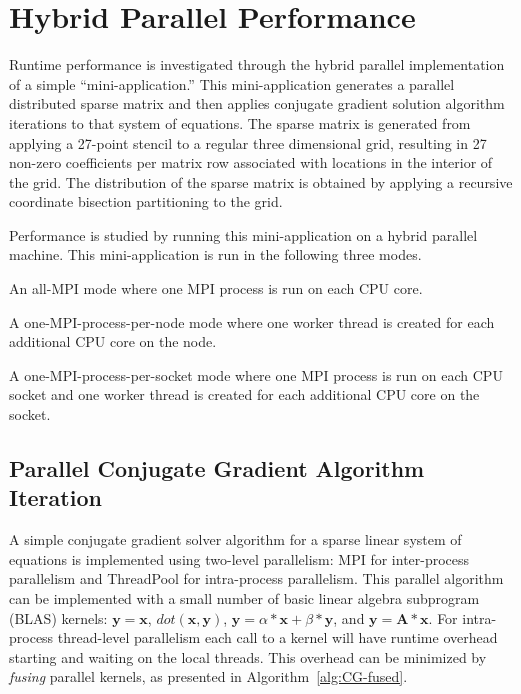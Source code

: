 \section{Hybrid Parallel Performance}

Runtime performance is investigated through the hybrid parallel implementation of a simple ``mini-application.'' 
%
This mini-application generates a parallel distributed sparse matrix and then applies conjugate gradient solution algorithm iterations to that system of equations.
%
The sparse matrix is generated from applying a 27-point stencil to a regular three dimensional grid, resulting in 27 non-zero coefficients per matrix row associated with locations in the interior of the grid.
%
The distribution of the sparse matrix is obtained by applying a recursive coordinate bisection \cite{RCB:1989} partitioning to the grid.


Performance is studied by running this mini-application on a hybrid parallel machine.
%
This mini-application is run in the following three modes.
\begin{blist}
\item An all-MPI mode where one MPI process is run on each CPU core.
\item A one-MPI-process-per-node mode where one worker thread is created for each additional CPU core on the node.
\item A one-MPI-process-per-socket mode where one MPI process is run on each CPU socket and one worker thread is created for each additional CPU core on the socket.
\end{blist}


\clearpage
\subsection{Parallel Conjugate Gradient Algorithm Iteration}

A simple conjugate gradient solver algorithm for a sparse linear system of equations is implemented using two-level parallelism: MPI for inter-process parallelism and ThreadPool for intra-process parallelism.
%
This parallel algorithm can be implemented with a small number of basic linear algebra subprogram (BLAS) kernels: 
$\mathbf{y}=\mathbf{x}$,
$dot(\mathbf{x},\mathbf{y})$, 
$\mathbf{y}=\alpha*\mathbf{x}+\beta*\mathbf{y}$, and
$\mathbf{y}=\mathbf{A}*\mathbf{x}$.
%
For intra-process thread-level parallelism each call to a kernel will have runtime overhead starting and waiting on the local threads.
%
This overhead can be minimized by \emph{fusing} parallel kernels, as presented in Algorithm~\ref{alg:CG-fused}.


